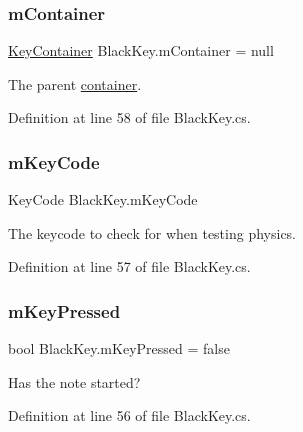 \subsubsection{\texorpdfstring{m\+Container}{mContainer}}
{\footnotesize\ttfamily \hyperlink{class_key_container}{Key\+Container} Black\+Key.\+m\+Container = null\hspace{0.3cm}{\ttfamily [private]}}



The parent \hyperlink{group___doc_key_contain}{container}. 



Definition at line 58 of file Black\+Key.\+cs.

\mbox{\label{group___black_key_priv_var_ga2272fa345880793dcd89f7ca942f6685}} 
\subsubsection{\texorpdfstring{m\+Key\+Code}{mKeyCode}}
{\footnotesize\ttfamily Key\+Code Black\+Key.\+m\+Key\+Code\hspace{0.3cm}{\ttfamily [private]}}



The keycode to check for when testing physics. 



Definition at line 57 of file Black\+Key.\+cs.

\mbox{\label{group___black_key_priv_var_gaf66e1f99786497961efaf5ded22e4977}} 
\subsubsection{\texorpdfstring{m\+Key\+Pressed}{mKeyPressed}}
{\footnotesize\ttfamily bool Black\+Key.\+m\+Key\+Pressed = false\hspace{0.3cm}{\ttfamily [private]}}



Has the note started? 



Definition at line 56 of file Black\+Key.\+cs.

